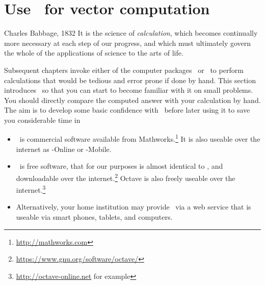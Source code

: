 

\section{Use \script\ for vector computation}
\label{sec:umovc}


\begin{quoted}{Charles Babbage, 1832}
It is the science of \emph{calculation}, which becomes continually more necessary at each step of our progress, and which must ultimately govern the whole of the applications of science to the arts of life.
\end{quoted}

Subsequent chapters invoke either of the computer packages \script[1]\ or \script[2]\ to perform calculations that would be tedious and error prone if done by hand.
This section introduces \script\ so that you can start to become familiar with it on small problems.
You should directly compare the computed answer with your calculation by hand.
The aim is to develop some basic confidence with \script\ before later using it to save you considerable time in 

\begin{itemize}
\item  \script[1]\ is commercial software available from Mathworks.\footnote{\url{http://mathworks.com}}
It is also useable over the internet as \script[1]-Online or \script[1]-Mobile.
\item \script[2]\ is free software, that for our purposes is almost identical to \script[1], and downloadable over the internet.\footnote{\url{https://www.gnu.org/software/octave/}}
Octave is also freely useable over the internet.\footnote{\url{http://octave-online.net} for example} 
\item Alternatively, your home institution may provide \script\ via a web service that is useable via smart phones, tablets, and computers.
\end{itemize}



\begin{comment}
Avoid plotting because I do not want to confuse a vector with a row vector of plot points.  Plotting is not high priority except for a few application sections.
\end{comment}



